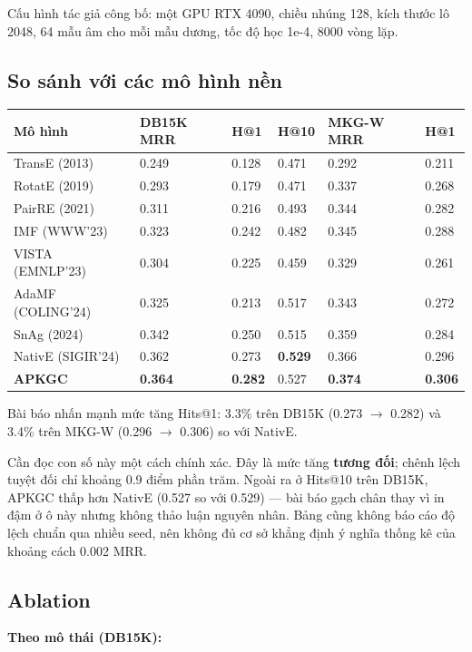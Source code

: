 \documentclass[11pt,a4paper]{article}
\begin{document}
Cấu hình tác giả công bố: một GPU RTX 4090, chiều nhúng 128, kích thước lô 2048, 64 mẫu âm cho mỗi mẫu dương, tốc độ học 1e-4, 8000 vòng lặp.

\subsection{So sánh với các mô hình nền}
\begin{center}\small
\begin{tabular}{@{}llllll@{}}
\toprule
\textbf{Mô hình} & \textbf{DB15K MRR} & \textbf{H@1} & \textbf{H@10} & \textbf{MKG-W MRR} & \textbf{H@1}\\
\midrule
TransE (2013) & 0.249 & 0.128 & 0.471 & 0.292 & 0.211\\
RotatE (2019) & 0.293 & 0.179 & 0.471 & 0.337 & 0.268\\
PairRE (2021) & 0.311 & 0.216 & 0.493 & 0.344 & 0.282\\
IMF (WWW'23) & 0.323 & 0.242 & 0.482 & 0.345 & 0.288\\
VISTA (EMNLP'23) & 0.304 & 0.225 & 0.459 & 0.329 & 0.261\\
AdaMF (COLING'24) & 0.325 & 0.213 & 0.517 & 0.343 & 0.272\\
SnAg (2024) & 0.342 & 0.250 & 0.515 & 0.359 & 0.284\\
NativE (SIGIR'24) & 0.362 & 0.273 & \textbf{0.529} & 0.366 & 0.296\\
\textbf{APKGC} & \textbf{0.364} & \textbf{0.282} & 0.527 & \textbf{0.374} & \textbf{0.306}\\
\bottomrule
\end{tabular}
\end{center}
Bài báo nhấn mạnh mức tăng Hits@1: 3.3\% trên DB15K (0.273 $\rightarrow$ 0.282) và 3.4\% trên MKG-W (0.296 $\rightarrow$ 0.306) so với NativE.

Cần đọc con số này một cách chính xác. Đây là mức tăng \textbf{tương đối}; chênh lệch tuyệt đối chỉ khoảng 0.9 điểm phần trăm. Ngoài ra ở Hits@10 trên DB15K, APKGC thấp hơn NativE (0.527 so với 0.529) --- bài báo gạch chân thay vì in đậm ở ô này nhưng không thảo luận nguyên nhân. Bảng cũng không báo cáo độ lệch chuẩn qua nhiều seed, nên không đủ cơ sở khẳng định ý nghĩa thống kê của khoảng cách 0.002 MRR.

\subsection{Ablation}
\textbf{Theo mô thái (DB15K):}
\end{document}
